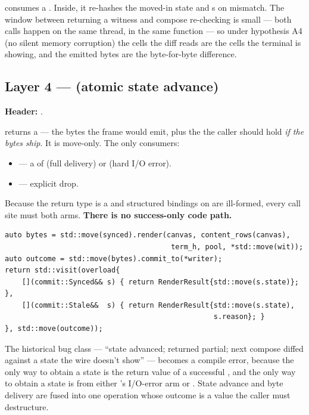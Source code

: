  consumes a .
Inside, it re-hashes the moved-in state and s on
mismatch. The window between  returning a
witness and compose re-checking is small --- both calls happen on
the same thread, in the same function --- so under hypothesis A4
(no silent memory corruption) the cells the diff reads are the cells
the terminal is showing, and the emitted bytes are the byte-for-byte
difference.

\subsection{Layer 4 ---  (atomic state advance)}

\textbf{Header:} .

 returns a  ---
the bytes the frame would emit, plus the 
the caller should hold \emph{if the bytes ship}. It is move-only.
The only consumers:

\begin{itemize}[leftmargin=*]
  \item {} --- a
     of  (full
    delivery) or  (hard I/O
    error).
  \item {} ---
    explicit drop.
\end{itemize}

Because the return type is a  and structured
bindings on  are ill-formed, every call site must
 both arms. \textbf{There is no success-only code
path.}

\begin{lstlisting}
auto bytes = std::move(synced).render(canvas, content_rows(canvas),
                                       term_h, pool, *std::move(wit));
auto outcome = std::move(bytes).commit_to(*writer);
return std::visit(overload{
    [](commit::Synced&& s) { return RenderResult{std::move(s.state)}; },
    [](commit::Stale&&  s) { return RenderResult{std::move(s.state),
                                                 s.reason}; }
}, std::move(outcome));
\end{lstlisting}

The historical bug class --- ``state advanced;  returned
partial; next compose diffed against a state the wire doesn't
show'' --- becomes a compile error, because the only way to obtain a
 state is the return value of a successful
, and the only way to obtain a  state
is from either 's I/O-error arm or
. State advance and byte delivery are fused into
one operation whose outcome is a value the caller must destructure.

